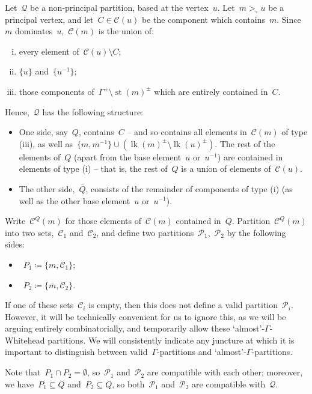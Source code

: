 \documentclass[11pt]{amsart}
\theoremstyle{definition}
\theoremstyle{definition}
\theoremstyle{definition}
\theoremstyle{definition}
\newcommand{\calC}{\mathcal{C}}
\newcommand{\calQ}{\mathcal{Q}}
\newcommand{\calP}{\mathcal{P}} %
\newcommand{\link}[1]{\operatorname{lk}({#1})} %
\newcommand{\str}[1]{\operatorname{st}({#1})} %
\begin{document}
Let~$\calQ$ be a non-principal partition, based at the vertex~$u$. Let~$m >_\circ u$ be a principal vertex, and let~$C \in \calC(u)$ be the component which contains~$m$. Since~$m$ dominates~$u$,~$\calC(m)$ is the union of:
\begin{enumerate}[(i)]
    \item every element of~$\calC(u) \setminus C$;
    \item \noindent$\{u\}$ and~$\{u^{-1}\}$;
    \item those components of~$\Gamma^\pm \setminus \str{m}^\pm$ which are entirely contained in~$C$.
\end{enumerate}
Hence,~$\calQ$ has the following structure:
\begin{itemize}
    \item One side, say~$Q$, contains~$C$ -- and so contains all elements in~$\calC(m)$ of type (iii), as well as~$\{m, m^{-1}\} \cup \left(\link{m}^\pm \setminus \link{u}^\pm\right)$. The rest of the elements of~$Q$ (apart from the base element~$u$ or~$u^{-1}$) are contained in elements of type (i) -- that is, the rest of~$Q$ is a union of elements of~$\calC(u)$.
    \item The other side,~$\overline{Q}$, consists of the remainder of components of type (i) (as well as the other base element~$u$ or~$u^{-1}$). 
\end{itemize}

Write~$\calC^Q(m)$ for those elements of~$\calC(m)$ contained in~$Q$. Partition~$\calC^Q(m)$ into two sets,~$\calC_1$ and~$\calC_2$, and define two partitions~$\calP_1$,~$\calP_2$ by the following sides:
\begin{itemize}
    \item~$P_1 \coloneqq \{m, \calC_1\}$;
    \item~$P_2 \coloneqq \{\overline{m}, \calC_2\}$.
\end{itemize}

If one of these sets~$\calC_i$ is empty, then this does not define a valid partition~$\calP_i$. However, it will be technically convenient for us to ignore this, as we will be arguing entirely combinatorially, and temporarily allow these `almost'-$\Gamma$-Whitehead partitions. We will consistently indicate any juncture at which it is important to distinguish between valid~$\Gamma$-partitions and `almost'-$\Gamma$-partitions. 

Note that~$P_1 \cap P_2 = \emptyset$, so~$\calP_1$ and~$\calP_2$ are compatible with each other; moreover, we have~$P_1 \subseteq Q$ and~$P_2 \subseteq Q$, so both~$\calP_1$ and~$\calP_2$ are compatible with~$\calQ$.
\end{document}
